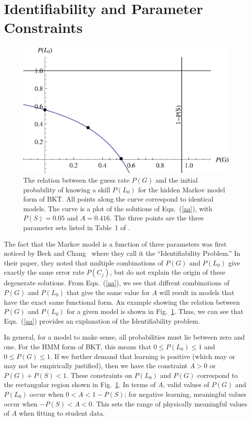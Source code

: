 \documentclass{acmlarge-edm}
\begin{document}
\section{Identifiability and Parameter Constraints}

\begin{figure}
\centering\includegraphics{table1.eps}
\caption{The relation between the guess rate $P(G)$ and the initial
  probability of knowing a skill $P(L_0)$ for the hidden
  Markov model form of BKT.  All points along the curve correspond
  to identical models.
  The curve is a plot of the solutions of Eqn.~(\ref{aa}), with $P(S)=0.05$ and $A=0.416$.
  The three points are the three parameter sets listed in Table~1 of
  \cite{beck_identifiability:_2007}.
}
 \label{table1}
\end{figure}

The fact that the Markov model is a function of three parameters
was first noticed by Beck and Chang~\citeyear{beck_identifiability:_2007} 
where they call it the ``Identifiability Problem.''   In their paper, 
they noted that multiple combinations of $P(G)$ and $P(L_0)$ give
exactly the same error rate $P(C_j)$, but do not explain the origin of 
these degenerate solutions.  From Eqn.~(\ref{aa}), we see that diffrent
combinations of $P(G)$ and $P(L_0)$ that give the same value for
$A$ will result in models that have the exact same functional form.   
An example showing the relation
between $P(G)$ and $P(L_0)$ for a given model is shown in Fig.~\ref{table1}.
Thus, we can see that Eqn.~(\ref{aa}) provides an explanation
of the Identifiability problem.

In general, for a model to make sense, all probabilities must lie between 
zero and one.  For the HMM form of BKT, this means that $0\le P(L_0)\le 1$ and $0\le P(G) \le 1$.
If we further demand that learning is positive (which may or may not be
empirically justified), then we have the constraint $A>0$ or $P(G)+P(S)<1$.  
These constraints on $P(L_0)$ and $P(G)$ correspond to the rectangular
region shown in Fig.~\ref{table1}. 
In terms of $A$, valid values of $P(G)$ and $P(L_0)$ occur when
$0<A<1-P(S)$; for negative learning, meaningful values occur when
$-P(S)<A<0$.  This sets the range of physically meaningful values of
$A$ when fitting to student data.
\end{document}
